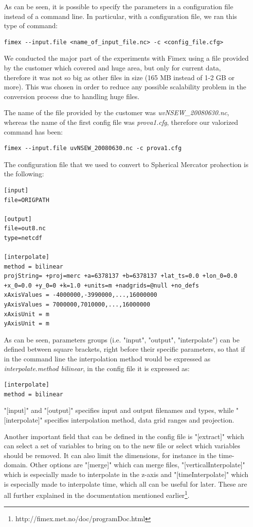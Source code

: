 \documentclass[11pt,a4paper,titlepage,oneside]{report}
\begin{document}
As can be seen, it is possible to specify the parameters in a configuration file instead of a command line.
In particular, with a configuration file, we ran this type of command:
\begin{lstlisting}
fimex --input.file <name_of_input_file.nc> -c <config_file.cfg>
\end{lstlisting}

We conducted the major part of the experiments with Fimex using a file provided by the customer which covered and huge area, but only for current data, therefore it was not so big as other files in size (165 MB instead of 1-2 GB or more). This was chosen in order to reduce any possible scalability problem in the conversion process due to handling huge files.

The name of the file provided by the customer was \textit{uvNSEW\_20080630.nc}, whereas the name of the first config file was \textit{prova1.cfg}, therefore our valorized command has been:
\begin{lstlisting}
fimex --input.file uvNSEW_20080630.nc -c prova1.cfg
\end{lstlisting}

The configuration file that we used to convert to Spherical Mercator prohection is the following:
\begin{lstlisting}
[input]
file=ORIGPATH

[output]
file=out8.nc
type=netcdf

[interpolate]
method = bilinear
projString= +proj=merc +a=6378137 +b=6378137 +lat_ts=0.0 +lon_0=0.0 +x_0=0.0 +y_0=0 +k=1.0 +units=m +nadgrids=@null +no_defs
xAxisValues = -4000000,-3990000,...,16000000
yAxisValues = 7000000,7010000,...,16000000
xAxisUnit = m
yAxisUnit = m
\end{lstlisting}

As can be seen, parameters groups (i.e. "input", "output", "interpolate") can be defined between square brackets, right before their specific parameters, so that if in the command line the interpolation method would be expressed as \textit{interpolate.method bilinear}, in the config file it is expressed as: 
\begin{lstlisting}
[interpolate]
method = bilinear
\end{lstlisting}

"[input]" and "[output]" specifies input and output filenames and types, while "[interpolate]" specifies interpolation method, data grid ranges and projection.

Another important field that can be defined in the config file is "[extract]" which can select a set of variables to bring on to the new file or select which variables should be removed. It can also limit the dimensions, for instance in the time-domain. Other options are "[merge]" which can merge files, "[verticalInterpolate]" which is especially made to interpolate in the z-axis and "[timeInterpolate]" which is especially made to interpolate time, which all can be useful for later. These are all further explained in the documentation mentioned earlier\footnote{http://fimex.met.no/doc/programDoc.html}.
\end{document}
